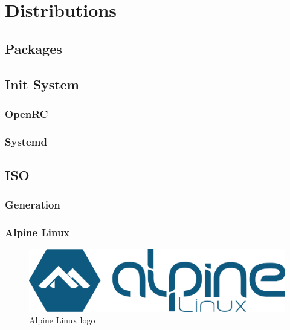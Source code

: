 \section{Distributions}
\label{sec:implementation_distributions}

\subsection{Packages}
\label{subsec:implementation_distributions_packages}

\subsection{Init System}
\label{subsec:implementation_distributions_init_system}

\subsubsection{OpenRC}
\label{subsec:implementation_distributions_init_system_openrc}

\subsubsection{Systemd}
\label{subsec:implementation_distributions_init_system_systemd}

\subsection{ISO}
\label{subsec:implementation_distributions_iso}

\subsubsection{Generation}
\label{subsubsec:implementation_distributions_iso_generation}

\subsubsection{Alpine Linux}
\label{subsubsec:implementation_distributions_iso_alpine_linux}

\begin{figure}
  \centering
  \includegraphics[width=.25\textwidth]{images/logos/alpine.png}
  \caption{Alpine Linux logo}
\end{figure}

